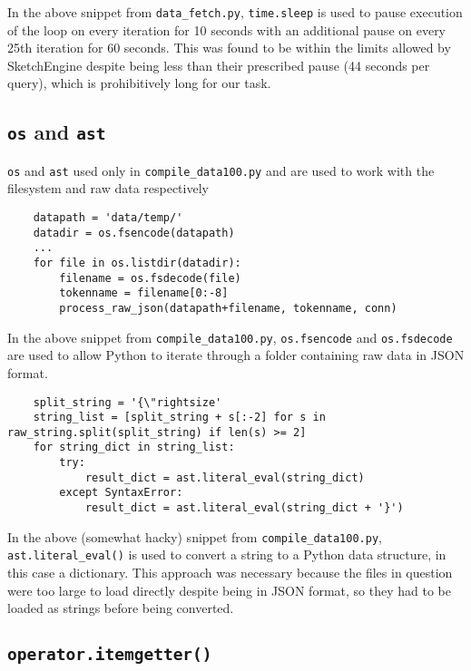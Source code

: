 \documentclass{article}      %
\begin{document}
	In the above snippet from \texttt{data\_fetch.py}, \texttt{time.sleep} is used to pause execution of the loop on every iteration for 10 seconds with an additional pause on every 25th iteration for 60 seconds. This was found to be within the limits allowed by SketchEngine despite being less than their prescribed pause (44 seconds per query), which is prohibitively long for our task.
	
	\subsection{\texttt{os} and \texttt{ast}}
	
	\texttt{os} and \texttt{ast} used only in \texttt{compile\_data100.py} and are used to work with the filesystem and raw data respectively
	
	\begin{verbatim}
	datapath = 'data/temp/'
	datadir = os.fsencode(datapath)
	...
	for file in os.listdir(datadir):
		filename = os.fsdecode(file)
		tokenname = filename[0:-8]
		process_raw_json(datapath+filename, tokenname, conn)
	\end{verbatim}
	
	In the above snippet from \texttt{compile\_data100.py}, \texttt{os.fsencode} and \texttt{os.fsdecode} are used to allow Python to iterate through a folder containing raw data in JSON format.
	
	\begin{verbatim}
	split_string = '{\"rightsize'
	string_list = [split_string + s[:-2] for s in raw_string.split(split_string) if len(s) >= 2]
	for string_dict in string_list:
		try:
			result_dict = ast.literal_eval(string_dict)
		except SyntaxError:
			result_dict = ast.literal_eval(string_dict + '}')
	\end{verbatim}
		
	In the above (somewhat hacky) snippet from \texttt{compile\_data100.py}, \texttt{ast.literal\_eval()} is used to convert a string to a Python data structure, in this case a dictionary. This approach was necessary because the files in question were too large to load directly despite being in JSON format, so they had to be loaded as strings before being converted.
	
	\subsection{\texttt{operator.itemgetter()}}
	
\end{document}
